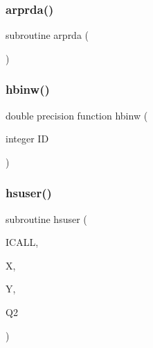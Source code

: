 \mbox{\label{djangoh__u_8f_a419b2d89c04c8355a7b8cb1b39c2eaae}} 
\subsubsection{\texorpdfstring{arprda()}{arprda()}}
{\footnotesize\ttfamily subroutine arprda (\begin{DoxyParamCaption}{ }\end{DoxyParamCaption})}

\mbox{\label{djangoh__u_8f_af22db7eb1d03f2627c021608064d87dc}} 
\subsubsection{\texorpdfstring{hbinw()}{hbinw()}}
{\footnotesize\ttfamily double precision function hbinw (\begin{DoxyParamCaption}\item[{integer}]{ID }\end{DoxyParamCaption})}

\mbox{\label{djangoh__u_8f_a96d7acf0122c4a21c1d461d27da11680}} 
\subsubsection{\texorpdfstring{hsuser()}{hsuser()}}
{\footnotesize\ttfamily subroutine hsuser (\begin{DoxyParamCaption}\item[{}]{I\+C\+A\+LL,  }\item[{}]{X,  }\item[{}]{Y,  }\item[{}]{Q2 }\end{DoxyParamCaption})}

